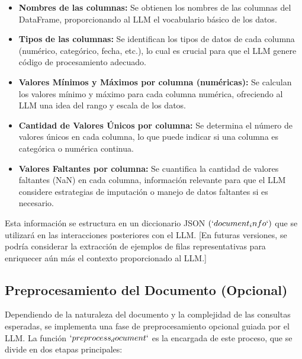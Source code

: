 \begin{itemize}
	\item \textbf{Nombres de las columnas:}  Se obtienen los nombres de las columnas del DataFrame, proporcionando al LLM el vocabulario básico de los datos.
	\item \textbf{Tipos de las columnas:}  Se identifican los tipos de datos de cada columna (numérico, categórico, fecha, etc.),  lo cual es crucial para que el LLM genere código de procesamiento adecuado.
	\item \textbf{Valores Mínimos y Máximos por columna (numéricas):} Se calculan los valores mínimo y máximo para cada columna numérica, ofreciendo al LLM una idea del rango y escala de los datos.
	\item \textbf{Cantidad de Valores Únicos por columna:} Se determina el número de valores únicos en cada columna, lo que puede indicar si una columna es categórica o numérica continua.
	\item \textbf{Valores Faltantes por columna:} Se cuantifica la cantidad de valores faltantes (NaN) en cada columna, información relevante para que el LLM considere estrategias de imputación o manejo de datos faltantes si es necesario.
\end{itemize}
Esta información se estructura en un diccionario JSON $(`document_info`)$ que se utilizará en las interacciones posteriores con el LLM.  [En futuras versiones, se podría considerar la extracción de ejemplos de filas representativas para enriquecer aún más el contexto proporcionado al LLM.]

\subsection{Preprocesamiento del Documento (Opcional)}

Dependiendo de la naturaleza del documento y la complejidad de las consultas esperadas, se implementa una fase de preprocesamiento opcional guiada por el LLM. La función $`preprocess_document`$ es la encargada de este proceso, que se divide en dos etapas principales:

